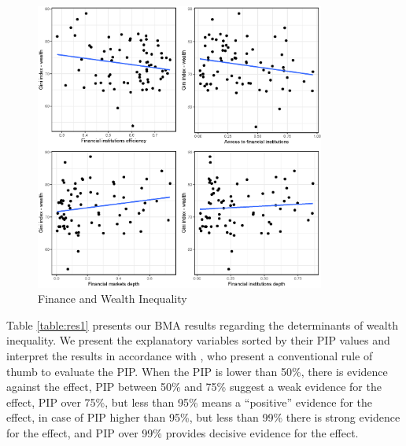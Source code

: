 \documentclass[a4paper,11pt]{article}
\begin{document}
\begin{figure}[ht]
	\caption{Finance and Wealth Inequality}
    \label{fig:findev}
    \begin{measuredfigure}
    \centering
	\includegraphics[width=0.85\textwidth, keepaspectratio]{figures/plots_findev.eps}
	\end{measuredfigure}
\end{figure}


Table \ref{table:res1} presents our BMA results regarding the determinants of wealth inequality. We present the explanatory variables sorted by their \ac{PIP} values and interpret the results in accordance with \citet{kass1995bayes}, who present a conventional rule of thumb to evaluate the \ac{PIP}. When the \ac{PIP} is lower than 50\%, there is evidence against the effect, \ac{PIP} between 50\% and 75\% suggest a weak evidence for the effect, \ac{PIP} over 75\%, but less than 95\% means a “positive” evidence for the effect, in case of \ac{PIP} higher than 95\%, but less than 99\% there is strong evidence for the effect, and \ac{PIP} over 99\% provides decisive evidence for the effect.
\end{document}
